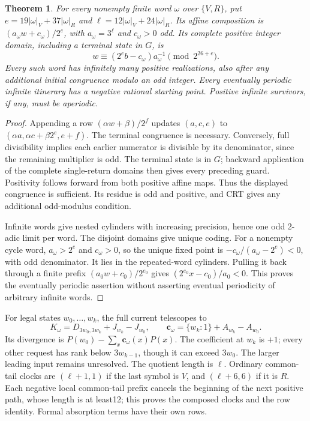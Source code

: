 \documentclass[11pt]{article}
\newtheorem{theorem}{Theorem}
\begin{document}
\begin{theorem}\label{thm:integerprefix}
For every nonempty finite word $\omega$ over $\{V,R\}$, put
$e=19|\omega|_V+37|\omega|_R$ and
$\ell=12|\omega|_V+24|\omega|_R$. Its affine composition is
$(a_\omega w+c_\omega)/2^e$, with $a_\omega=3^\ell$ and $c_\omega>0$ odd.
Its complete positive integer domain, including a terminal state in $G$, is
\[
 w\equiv(2^e b-c_\omega)a_\omega^{-1}\pmod{2^{26+e}}.
\]
Every such word has infinitely many positive realizations, also after
any additional initial congruence modulo an odd integer.
Every eventually periodic infinite itinerary has a negative rational
starting point. Positive infinite survivors, if any, must be aperiodic.
\end{theorem}
\begin{proof}
Appending a row $(\alpha w+\beta)/2^f$ updates
$(a,c,e)$ to $(\alpha a,\alpha c+\beta2^e,e+f)$.
The terminal congruence is necessary. Conversely, full divisibility
implies each earlier numerator is divisible by its denominator, since
the remaining multiplier is odd. The terminal state is in $G$;
backward application of the complete single-return domains then gives
every preceding guard. Positivity follows forward from both positive
affine maps. Thus the displayed congruence is sufficient. Its residue is
odd and positive, and CRT gives any additional odd-modulus condition.

Infinite words give nested cylinders with increasing precision, hence
one odd 2-adic limit per word. The disjoint domains give unique coding.
For a nonempty cycle word, $a_\omega>2^e$ and $c_\omega>0$, so the
unique fixed point is
$-c_\omega/(a_\omega-2^e)<0$, with odd denominator.
It lies in the repeated-word cylinders. Pulling it back through a finite
prefix $(a_0w+c_0)/2^{e_0}$ gives
$(2^{e_0}x-c_0)/a_0<0$.
This proves the eventually periodic assertion without asserting eventual
periodicity of arbitrary infinite words.
\end{proof}

For legal states $w_0,\ldots,w_k$, the full current telescopes to
\[
 K_\omega=D_{3w_0,3w_k}+J_{w_k}-J_{w_0},\qquad
 \mathbf c_\omega=\{w_k:1\}+A_{w_k}-A_{w_0}.
\]
Its divergence is $P(w_0)-\sum_x\mathbf c_\omega(x)P(x)$.
The coefficient at $w_k$ is $+1$; every other request has rank below
$3w_{k-1}$, though it can exceed $3w_0$. The larger leading input remains
unresolved. The quotient length is $\ell$. Ordinary common-tail clocks
are $(\ell+1,1)$ if the last symbol is $V$, and $(\ell+6,6)$ if it is $R$.
Each negative local common-tail prefix cancels the beginning of the next
positive path, whose length is at least12; this proves the composed clocks
and the row identity. Formal absorption terms have their own rows.
\end{document}
